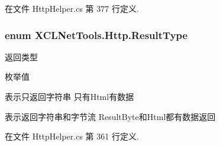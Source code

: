 在文件 Http\-Helper.\-cs 第 377 行定义.

\hypertarget{namespace_x_c_l_net_tools_1_1_http_a3216524397972f7d0c5733b123216e9e}{
\subsubsection[{Result\-Type}]{\setlength{\rightskip}{0pt plus 5cm}enum {\bf X\-C\-L\-Net\-Tools.\-Http.\-Result\-Type}}}\label{namespace_x_c_l_net_tools_1_1_http_a3216524397972f7d0c5733b123216e9e}


返回类型 

\begin{Desc}
\item[枚举值]\par
\begin{description}
\item[{\em 
\hypertarget{namespace_x_c_l_net_tools_1_1_http_a3216524397972f7d0c5733b123216e9ea27118326006d3829667a400ad23d5d98}{String}\label{namespace_x_c_l_net_tools_1_1_http_a3216524397972f7d0c5733b123216e9ea27118326006d3829667a400ad23d5d98}
}]表示只返回字符串 只有\-Html有数据 \item[{\em 
\hypertarget{namespace_x_c_l_net_tools_1_1_http_a3216524397972f7d0c5733b123216e9eaa245c3230debe5c956484ecc6fa93877}{Byte}\label{namespace_x_c_l_net_tools_1_1_http_a3216524397972f7d0c5733b123216e9eaa245c3230debe5c956484ecc6fa93877}
}]表示返回字符串和字节流 Result\-Byte和\-Html都有数据返回 \end{description}
\end{Desc}


在文件 Http\-Helper.\-cs 第 361 行定义.

